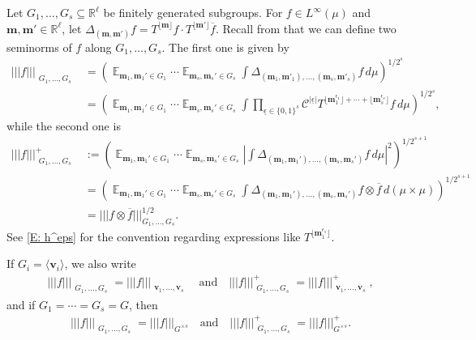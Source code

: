\documentclass[11pt]{amsart}
\theoremstyle{definition}
\DeclareMathOperator*{\E}{\mathbb{E}}
\newcommand{\R}{{\mathbb R}}
\newcommand{\CC}{{\mathcal C}}
\newcommand{\bm}{{\mathbf{m}}}
\newcommand{\bv}{{\mathbf{v}}}
\newcommand{\eps}{\epsilon}
\newcommand{\ueps}{{\underline{\epsilon}}}
\newcommand{\nnorm}[1]{\lvert\!|\!| #1|\!|\!\rvert}
\newcommand{\1}{{\mathbf{1}}}
\newcommand{\abs}[1]{\mathopen{}\left| #1\mathclose{}\right|}
\newcommand{\brac}[1]{\mathopen{}\left( #1 \mathclose{}\right)}
\newcommand{\sfloor}[1]{{\lfloor #1 \rfloor}}
\begin{document}
Let $G_1, \ldots, G_s\subseteq\R^\ell$ be finitely generated subgroups. For $f\in L^\infty(\mu)$ and $\bm,\bm'\in\R^\ell$, let $\Delta_{(\bm,\bm')}f = T^{\sfloor{\bm}}f\cdot T^{\sfloor{\bm'}}\overline{f}$. Recall from \cite{DKKST24} that we can define two seminorms of $f$ along $G_1, \ldots, G_s$. The first one is given by
\begin{align*}
    \nnorm{f}_{\substack{G_1, \ldots, G_s}} &= \brac{\E_{\bm_1, \bm_1'\in G_1}\cdots \E_{\bm_s, \bm_s'\in G_s}\int \Delta_{({\bm_1}, {\bm'_1}), \ldots, ({\bm_s}, {\bm'_s})}f\, d\mu}^{1/2^{s}}\\
    &= \brac{\E_{\bm_1, \bm_1'\in G_1}\cdots \E_{\bm_s, \bm_s'\in G_s}\int \prod_{\ueps\in\{0,1\}^s}\CC^{|\ueps|}T^{\sfloor{\bm_1^{\eps_1}}+\cdots + \sfloor{\bm_s^{\eps_s}}} f\, d\mu}^{1/2^{s}},
\end{align*}
while the second one is 
\begin{align*}
    \nnorm{f}^+_{\substack{G_1, \ldots, G_s}} &:=  \brac{\E_{\bm_1, \bm_1'\in G_1}\cdots \E_{\bm_s, \bm_s'\in G_s}\abs{\int \Delta_{({\bm_1}, {\bm_1'}), \ldots, ({\bm_s}, {\bm_s'})}f\, d\mu}^2}^{1/2^{s+1}}\\
      &= \brac{\E_{\bm_1, \bm_1'\in G_1}\cdots \E_{\bm_s, \bm_s'\in G_s}\int \Delta_{({\bm_1}, {\bm_1'}), \ldots, ({\bm_s}, {\bm_s'})}f\otimes\overline{f}\, d(\mu\times\mu)}^{1/2^{s+1}}\\
      &=\nnorm{f\otimes\overline{f}}_{G_1, \ldots, G_s}^{1/2}.
\end{align*}
See \eqref{E: h^eps} for the convention regarding expressions like $T^{\sfloor{\bm_1^{\eps_1}}}$.

If $G_i = \langle \bv_i\rangle$, we also write 
\begin{align*}
    \nnorm{f}_{\substack{G_1, \ldots, G_s}} = \nnorm{f}_{\substack{\bv_1, \ldots, \bv_s}}\quad \textrm{and}\quad \nnorm{f}^+_{\substack{G_1, \ldots, G_s}} = \nnorm{f}^+_{\substack{\bv_1, \ldots, \bv_s}},
\end{align*}
and if $G_1 = \cdots = G_s = G$, then
\begin{align*}
    \nnorm{f}_{\substack{G_1, \ldots, G_s}} = \nnorm{f}_{G^{\times s}}\quad \textrm{and}\quad \nnorm{f}^+_{\substack{G_1, \ldots, G_s}} = \nnorm{f}^+_{G^{\times s}}.
\end{align*}
\end{document}
